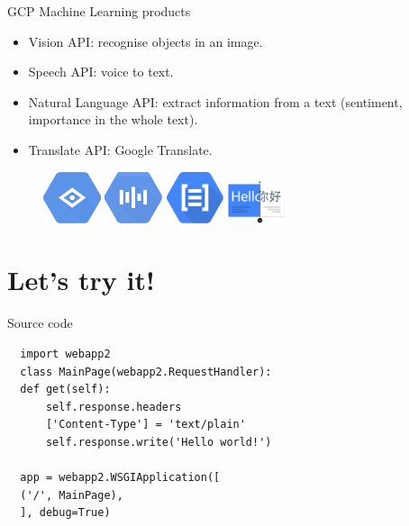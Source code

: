 \documentclass{beamer}
\begin{document}
\begin{frame}[fragile]{GCP Machine Learning products}
  \begin{itemize}[<+->]
    \item Vision API: recognise objects in an image.
    \item Speech API: voice to text.
    \item Natural Language API: extract information from a text (sentiment, importance in the whole text).
    \item Translate API: Google Translate.
  \end{itemize}
  \vspace{1cm}
  \begin{figure}[H]
    \includegraphics[width=0.15\textwidth]{img/vision}
    \hspace{0.7cm}   \includegraphics[width=0.15\textwidth]{img/speech}
    \hspace{0.7cm}
     \includegraphics[width=0.15\textwidth]{img/natural-language}
     \hspace{0.7cm}
     \includegraphics[width=0.15\textwidth]{img/translate}
  \end{figure}
\end{frame}

\section{Let's try it!}



\begin{frame}[fragile]{Source code}
  \begin{verbatim}
  import webapp2
  class MainPage(webapp2.RequestHandler):
  def get(self):
      self.response.headers
      ['Content-Type'] = 'text/plain'
      self.response.write('Hello world!')

  app = webapp2.WSGIApplication([
  ('/', MainPage),
  ], debug=True)


  \end{verbatim}
\end{frame}
\end{document}
